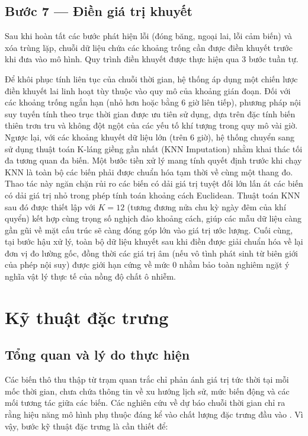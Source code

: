 \subsection{Bước 7 --- Điền giá trị khuyết}

Sau khi hoàn tất các bước phát hiện lỗi (đóng băng, ngoại lai, lỗi cảm biến) và xóa trùng lặp, chuỗi dữ liệu chứa các khoảng trống cần được điền khuyết trước khi đưa vào mô hình. Quy trình điền khuyết được thực hiện qua 3 bước tuần tự.

Để khôi phục tính liên tục của chuỗi thời gian, hệ thống áp dụng một chiến lược điền khuyết lai linh hoạt tùy thuộc vào quy mô của khoảng gián đoạn. Đối với các khoảng trống ngắn hạn (nhỏ hơn hoặc bằng 6 giờ liên tiếp), phương pháp nội suy tuyến tính theo trục thời gian được ưu tiên sử dụng, dựa trên đặc tính biến thiên trơn tru và không đột ngột của các yếu tố khí tượng trong quy mô vài giờ. Ngược lại, với các khoảng khuyết dữ liệu lớn (trên 6 giờ), hệ thống chuyển sang sử dụng thuật toán K-láng giềng gần nhất (KNN Imputation) \cite{troyanskaya2001knn} nhằm khai thác tối đa tương quan đa biến. Một bước tiền xử lý mang tính quyết định trước khi chạy KNN là toàn bộ các biến phải được chuẩn hóa tạm thời về cùng một thang đo. Thao tác này ngăn chặn rủi ro các biến có dải giá trị tuyệt đối lớn lấn át các biến có dải giá trị nhỏ trong phép tính toán khoảng cách Euclidean. Thuật toán KNN sau đó được thiết lập với $K=12$ (tương đương nửa chu kỳ ngày đêm của khí quyển) kết hợp cùng trọng số nghịch đảo khoảng cách, giúp các mẫu dữ liệu càng gần gũi về mặt cấu trúc sẽ càng đóng góp lớn vào giá trị ước lượng. Cuối cùng, tại bước hậu xử lý, toàn bộ dữ liệu khuyết sau khi điền được giải chuẩn hóa  về lại đơn vị đo lường gốc, đồng thời các giá trị âm (nếu vô tình phát sinh từ biên giới của phép nội suy) được giới hạn cứng về mức $0$ nhằm bảo toàn nghiêm ngặt ý nghĩa vật lý thực tế của nồng độ chất ô nhiễm.
\section{Kỹ thuật đặc trưng}

\subsection{Tổng quan và lý do thực hiện}

Các biến thô thu thập từ trạm quan trắc chỉ phản ánh giá trị tức thời tại mỗi mốc thời gian, chưa chứa thông tin về xu hướng lịch sử, mức biến động và các mối tương tác giữa các biến. Các nghiên cứu về dự báo chuỗi thời gian chỉ ra rằng hiệu năng mô hình phụ thuộc đáng kể vào chất lượng đặc trưng đầu vào \cite{Chen_2016}. Vì vậy, bước kỹ thuật đặc trưng là cần thiết để:

